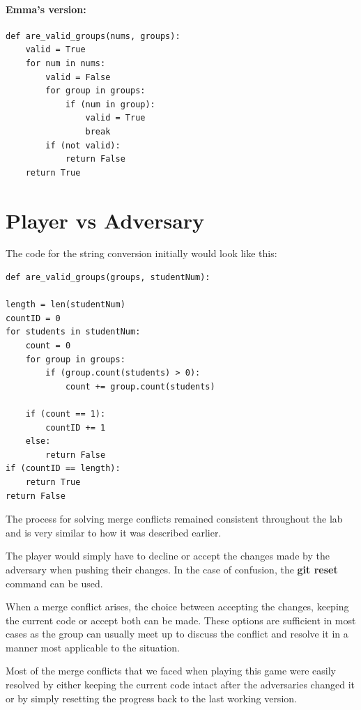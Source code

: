 \documentclass[twocolumn, 10pt]{article}
\begin{document}
\paragraph{Emma's version:}

\footnotesize
\begin{verbatim}
def are_valid_groups(nums, groups):
    valid = True
    for num in nums:
        valid = False
        for group in groups:
            if (num in group): 
                valid = True
                break
        if (not valid):
            return False
    return True
\end{verbatim}
\normalsize

\section{Player vs Adversary}

The code for the string conversion initially would look like this:

\footnotesize
\begin{verbatim}
def are_valid_groups(groups, studentNum):

length = len(studentNum)
countID = 0   
for students in studentNum:
    count = 0
    for group in groups:
        if (group.count(students) > 0):
            count += group.count(students)

    if (count == 1):
        countID += 1
    else:
        return False
if (countID == length):
    return True
return False
\end{verbatim}
\normalsize

The process for solving merge conflicts remained consistent throughout the lab and is very similar to how it was described earlier.

The player would simply have to decline or accept the changes made by the adversary when pushing their changes. In the case of confusion, the \textbf{git reset} command can be used.

When a merge conflict arises, the choice between accepting the changes, keeping the current code or accept both can be made. These options are sufficient in most cases as the group can usually meet up to discuss the conflict and resolve it in a manner most applicable to the situation.

Most of the merge conflicts that we faced when playing this game were easily resolved by either keeping the current code intact after the adversaries changed it or by simply resetting the progress back to the last working version.
\end{document}

